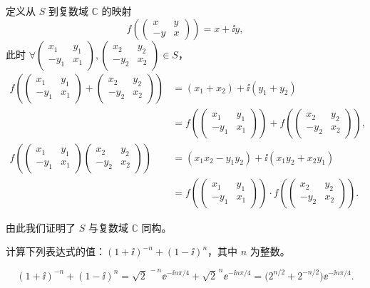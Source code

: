 \begin{question}
\begin{solution}
定义从 \(S\) 到复数域 \(\mathbb{C}\) 的映射
\[
f\!\left(\begin{pmatrix}x&y\\-y&x\end{pmatrix}\right)=x+\ii y,
\]
此时 \(\forall\begin{pmatrix}x_1&y_1\\-y_1&x_1\end{pmatrix},
\begin{pmatrix}x_2&y_2\\-y_2&x_2\end{pmatrix}\in S\)，
\[
\begin{aligned}
f\!\left(\begin{pmatrix}x_1&y_1\\-y_1&x_1\end{pmatrix}
+\begin{pmatrix}x_2&y_2\\-y_2&x_2\end{pmatrix}\right)
&=(x_1+x_2)+\ii(y_1+y_2)\\
&=f\!\left(\begin{pmatrix}x_1&y_1\\-y_1&x_1\end{pmatrix}\right)
+f\!\left(\begin{pmatrix}x_2&y_2\\-y_2&x_2\end{pmatrix}\right),\\[4pt]
f\!\left(\begin{pmatrix}x_1&y_1\\-y_1&x_1\end{pmatrix}
\begin{pmatrix}x_2&y_2\\-y_2&x_2\end{pmatrix}\right)
&=(x_1x_2-y_1y_2)+\ii(x_1y_2+x_2y_1)\\
&=f\!\left(\begin{pmatrix}x_1&y_1\\-y_1&x_1\end{pmatrix}\right)
\cdot f\!\left(\begin{pmatrix}x_2&y_2\\-y_2&x_2\end{pmatrix}\right).
\end{aligned}
\]

由此我们证明了 \(S\) 与复数域 \(\mathbb{C}\) 同构。
\end{solution}
\end{question}


\begin{question}
计算下列表达式的值：\((1+\ii)^{-n}+(1-\ii)^{n}\)，其中 \(n\) 为整数。
\begin{solution}
\[
(1+\ii)^{-n}+(1-\ii)^{n}
= \sqrt{2}^{\,-n}\ee^{-\ii n\pi/4} + \sqrt{2}^{\,n}\ee^{-\ii n\pi/4}
= \bigl(2^{n/2}+2^{-n/2}\bigr)\ee^{-\ii n\pi/4}.
\]
\end{solution}
\end{question}


